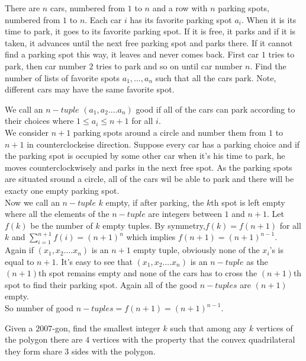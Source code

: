 \documentclass{subfile}
\begin{document}
	\begin{problem}
		There are $n$ cars, numbered from $1$ to $n$ and a row with $n$ parking spots, numbered from $1$ to $n$. Each car $i$ has its favorite parking spot $a_i$. When it is its time to park, it goes to its favorite parking spot. If it is free, it parks and if it is taken, it advances until the next free parking spot and parks there. If it cannot find a parking spot this way, it leaves and never
		comes back. First car $1$ tries to park, then car number $2$ tries to park and so on until car number $n$. Find the number of lists of favorite spots $a_1, ..., a_n$ such that all the cars park. Note, different cars may have the same favorite spot.
	\end{problem}
	\begin{solution}
	    We call an $n-tuple$ $(a_1,a_2.\dots a_n)$ good if all of the cars can park according to their choices where $1\leq a_i\leq n+1$ for all $i$.\\
        
        We consider $n+1$ parking spots around a circle and number them from $1$ to $n+1$ in counterclockeise direction. Suppose every car has a parking choice and if the parking spot is occupied by some other car when it's his   time to park, he moves counterclockwisely and parks in the next free spot. As the parking spots are situated sround a circle, all of the cars wil be able to park and there will be exacty one empty parking spot. \\
        
        Now we call an $n-tuple$ $k$ empty, if after parking, the $k$th spot is left empty where all the elements of the $n-tuple$ are integers between $1$ and $n+1$. Let $f(k)$ be the number of $k$ empty tuples. By symmetry,$f(k)=f(n+1)$ for all $k$ and $\sum_{i=1}^{n+1}f(i)=(n+1)^n$ which implies $f(n+1)=(n+1)^{n-1}$.\\
        
        Again if $(x_1,x_2.\dots x_n)$ is an $n+1$ empty tuple, obviously none of the $x_i$'s is equal to $n+1$. It's easy to see that $(x_1,x_2.\dots x_n)$ is an $n-tuple$ as the $(n+1)$th spot remains empty and none of the cars has to cross the $(n+1)$th spot to find their parking spot. Again all of the good $n-tuples$ are $(n+1)$ empty.\\
        
        So number of good $n-tuples=f(n+1)=(n+1)^{n-1}$.
    \end{solution}
	   
	
	\begin{problem}
		Given a $2007$-gon, find the smallest integer $k$ such that among any $k$ vertices of the polygon
		there are $4$ vertices with the property that the convex quadrilateral they form share $3$ sides
		with the polygon.
	\end{problem}
	
\end{document}

